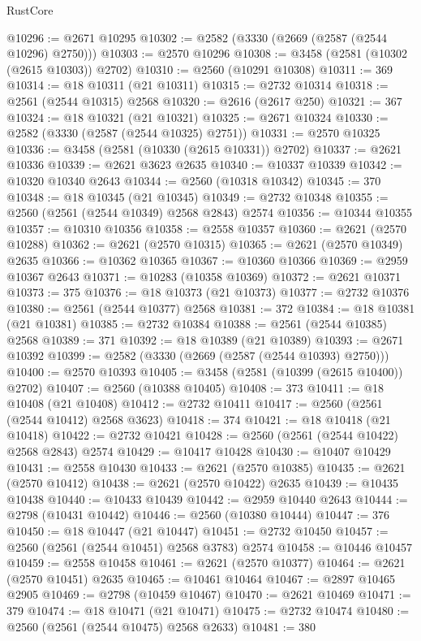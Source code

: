 \begin{lexlean}{RustCore}
\begin{coremodule}
@10296 := @2671 @10295
@10302 := @2582 (@3330 (@2669 (@2587 (@2544 @10296) @2750)))
@10303 := @2570 @10296
@10308 := @3458 (@2581 (@10302 (@2615 @10303)) @2702)
@10310 := @2560 (@10291 @10308)
@10311 := 369
@10314 := @18 @10311 (@21 @10311)
@10315 := @2732 @10314
@10318 := @2561 (@2544 @10315) @2568
@10320 := @2616 (@2617 @250)
@10321 := 367
@10324 := @18 @10321 (@21 @10321)
@10325 := @2671 @10324
@10330 := @2582 (@3330 (@2587 (@2544 @10325) @2751))
@10331 := @2570 @10325
@10336 := @3458 (@2581 (@10330 (@2615 @10331)) @2702)
@10337 := @2621 @10336
@10339 := @2621 @3623 @2635
@10340 := @10337 @10339
@10342 := @10320 @10340 @2643
@10344 := @2560 (@10318 @10342)
@10345 := 370
@10348 := @18 @10345 (@21 @10345)
@10349 := @2732 @10348
@10355 := @2560 (@2561 (@2544 @10349) @2568 @2843) @2574
@10356 := @10344 @10355
@10357 := @10310 @10356
@10358 := @2558 @10357
@10360 := @2621 (@2570 @10288)
@10362 := @2621 (@2570 @10315)
@10365 := @2621 (@2570 @10349) @2635
@10366 := @10362 @10365
@10367 := @10360 @10366
@10369 := @2959 @10367 @2643
@10371 := @10283 (@10358 @10369)
@10372 := @2621 @10371
@10373 := 375
@10376 := @18 @10373 (@21 @10373)
@10377 := @2732 @10376
@10380 := @2561 (@2544 @10377) @2568
@10381 := 372
@10384 := @18 @10381 (@21 @10381)
@10385 := @2732 @10384
@10388 := @2561 (@2544 @10385) @2568
@10389 := 371
@10392 := @18 @10389 (@21 @10389)
@10393 := @2671 @10392
@10399 := @2582 (@3330 (@2669 (@2587 (@2544 @10393) @2750)))
@10400 := @2570 @10393
@10405 := @3458 (@2581 (@10399 (@2615 @10400)) @2702)
@10407 := @2560 (@10388 @10405)
@10408 := 373
@10411 := @18 @10408 (@21 @10408)
@10412 := @2732 @10411
@10417 := @2560 (@2561 (@2544 @10412) @2568 @3623)
@10418 := 374
@10421 := @18 @10418 (@21 @10418)
@10422 := @2732 @10421
@10428 := @2560 (@2561 (@2544 @10422) @2568 @2843) @2574
@10429 := @10417 @10428
@10430 := @10407 @10429
@10431 := @2558 @10430
@10433 := @2621 (@2570 @10385)
@10435 := @2621 (@2570 @10412)
@10438 := @2621 (@2570 @10422) @2635
@10439 := @10435 @10438
@10440 := @10433 @10439
@10442 := @2959 @10440 @2643
@10444 := @2798 (@10431 @10442)
@10446 := @2560 (@10380 @10444)
@10447 := 376
@10450 := @18 @10447 (@21 @10447)
@10451 := @2732 @10450
@10457 := @2560 (@2561 (@2544 @10451) @2568 @3783) @2574
@10458 := @10446 @10457
@10459 := @2558 @10458
@10461 := @2621 (@2570 @10377)
@10464 := @2621 (@2570 @10451) @2635
@10465 := @10461 @10464
@10467 := @2897 @10465 @2905
@10469 := @2798 (@10459 @10467)
@10470 := @2621 @10469
@10471 := 379
@10474 := @18 @10471 (@21 @10471)
@10475 := @2732 @10474
@10480 := @2560 (@2561 (@2544 @10475) @2568 @2633)
@10481 := 380

\end{coremodule}
\end{lexlean}
